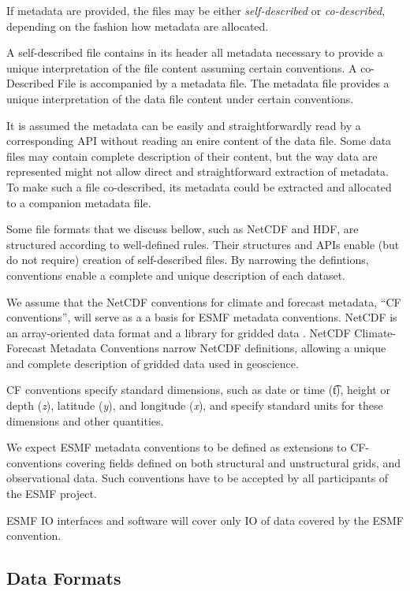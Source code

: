 If metadata are provided, the files may be either {\em self-described} or
{\em co-described}, depending on the fashion how metadata are allocated.

A self-described file contains in its header all metadata necessary to 
provide a unique interpretation of the file content assuming certain 
conventions.  A co-Described File is accompanied by a metadata file. The
metadata file provides a unique interpretation of the data file content
under certain conventions. 

It is assumed the metadata can be easily and straightforwardly read by a 
corresponding API without reading an enire content of the data file. Some 
data files may contain complete description of their content, but the way 
data are represented might not allow direct and straightforward extraction of 
metadata. To make such a file co-described, its metadata could be extracted 
and allocated to a companion metadata file.

Some file formats that we discuss bellow, such as NetCDF and HDF, are 
structured according to well-defined rules. Their structures and APIs enable 
(but do not require) creation of self-described files. By narrowing 
the defintions, conventions enable a complete and unique description of each 
dataset.

We assume that the NetCDF conventions for climate and forecast metadata, 
``CF conventions'', will serve as a a basis for ESMF metadata conventions.
NetCDF is an array-oriented data format and a library for gridded data 
\cite{NetCDF3_UsersGuide_C}. NetCDF Climate-Forecast Metadata Conventions
\cite{NetCDF_CF_v1_beta3} narrow NetCDF definitions, allowing a unique and 
complete description of gridded data used in geoscience. 

CF conventions specify standard dimensions, such as date or time ({\t t}), 
height or depth ({\it z}), latitude ({\it y}), and longitude ({\it x}), and 
specify standard units for these dimensions and other quantities. 

We expect ESMF metadata conventions to be defined as extensions to
CF-conventions covering fields defined on both structural and unstructural 
grids, and observational data. Such conventions have to be accepted by all 
participants of the ESMF project.

ESMF I\/O interfaces and software will cover only I\/O of data covered by
the ESMF convention.




\subsection{Data Formats}



